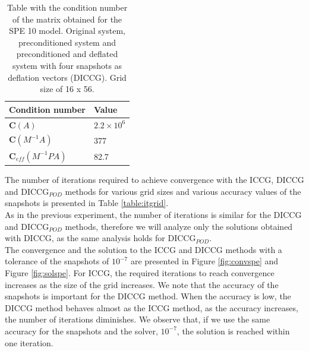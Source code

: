 \documentclass{ecmorXV}
\begin{document}
\begin{table}[!ht]
\centering
\begin{tabular}{ |p{2.3cm}|p{2.3cm}|  } 
\hline
   Condition number &Value\\ 
   \hline
   $\mathbf{C}(A)$ &$2.2\times10^{6}$\\ 
   \hline
   $\mathbf{C}(M^{-1}A)$ &377\\ 
   \hline
 $\mathbf{C}_{eff}(M^{-1}PA)$  &82.7\\
\hline
\end{tabular}
\caption{Table with the condition number of the matrix obtained for the SPE 10 model. Original system,
preconditioned system and preconditioned and deflated system with four snapshots as deflation vectors (DICCG). 
Grid size of 16 x 56.}
\label{table:condnspe}
\end{table}
The number of iterations required to achieve convergence with the ICCG, DICCG and DICCG$_{POD}$ methods for various
grid sizes and various accuracy values of the snapshots is presented in Table \ref{table:itgrid}. \\
As in the previous experiment, the number of iterations is similar for the DICCG and DICCG$_{POD}$ methods,
therefore we will analyze only the solutions obtained with DICCG, as the same analysis holds for DICCG$_{POD}$.
\\The convergence and the solution to the ICCG and DICCG methods with a tolerance of the snapshots 
of $10^{-7}$ are presented in Figure \ref{fig:convspe} and Figure \ref{fig:solspe}. 
For ICCG, the required iterations to reach convergence increases as the size of the grid increases. 
We note that the accuracy of the snapshots is important for the DICCG method. 
When the accuracy is low, the DICCG method behaves almost as the ICCG method, 
as the accuracy increases, the number of iterations diminishes. We observe that, if we use the same 
accuracy for the snapshots and the solver, $10^{-7}$, the solution is reached within one iteration.  \\
\end{document}
